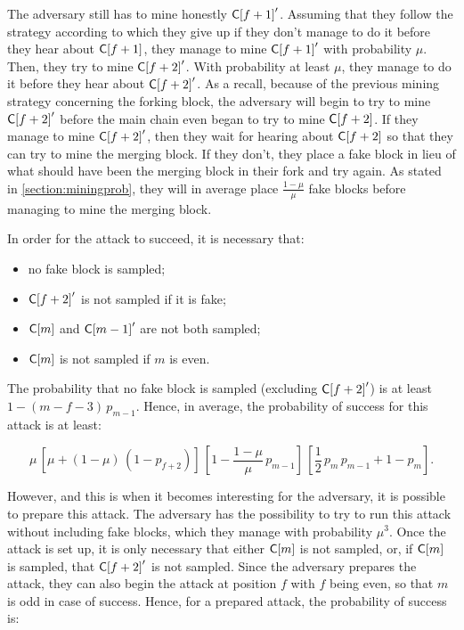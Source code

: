         The adversary still has to mine honestly \(\mathsf{C[}f+1\mathsf{]}'\). Assuming that they follow the strategy according to which they give up if they don't manage to do it before they hear about \(\mathsf{C[}f+1\mathsf{]}\), they manage to mine \(\mathsf{C[}f+1\mathsf{]}'\) with probability \(\mu\). Then, they try to mine \(\mathsf{C[}f+2\mathsf{]}'\). With probability at least \(\mu\), they manage to do it before they hear about \(\mathsf{C[}f+2\mathsf{]}'\). As a recall, because of the previous mining strategy concerning the forking block, the adversary will begin to try to mine \(\mathsf{C[}f+2\mathsf{]}'\) before the main chain even began to try to mine \(\mathsf{C[}f+2\mathsf{]}\). If they manage to mine \(\mathsf{C[}f+2\mathsf{]}'\), then they wait for hearing about \(\mathsf{C[}f+2\mathsf{]}\) so that they can try to mine the merging block. If they don't, they place a fake block in lieu of what should have been the merging block in their fork and try again. As stated in \autoref{section:miningprob}, they will in average place \(\frac{1-\mu}{\mu}\) fake blocks before managing to mine the merging block.

        In order for the attack to succeed, it is necessary that:

        \begin{itemize}
          \item no fake block is sampled;
          \item \(\mathsf{C[}f+2\mathsf{]}'\) is not sampled if it is fake; 
          \item \(\mathsf{C[}m\mathsf{]}\) and \(\mathsf{C[}m-1\mathsf{]}'\) are not both sampled;
          \item \(\mathsf{C[}m\mathsf{]}\) is not sampled if \(m\) is even.  
        \end{itemize}

        The probability that no fake block is sampled (excluding \(\mathsf{C[}f+2\mathsf{]}'\)) is at least \(1-(m-f-3)\,p_{m-1}\). Hence, in average, the probability of success for this attack is at least:

        \[
                \mu\,\left[\mu+(1-\mu)\,\left(1-p_{f+2}\right)\right]\,\left[1-\frac{1-\mu}{\mu}\,p_{m-1}\right]\,\left[\frac12\,p_m\,p_{m-1}+1-p_m\right]
        .\] 

        However, and this is when it becomes interesting for the adversary, it is possible to prepare this attack. The adversary has the possibility to try to run this attack without including fake blocks, which they manage with probability \(\mu^3\). Once the attack is set up, it is only necessary that either \(\mathsf{C[}m\mathsf{]}\) is not sampled, or, if \(\mathsf{C[}m\mathsf{]}\) is sampled, that \(\mathsf{C[}f+2\mathsf{]}'\) is not sampled. Since the adversary prepares the attack, they can also begin the attack at position \(f\) with \(f\) being even, so that \(m\) is odd in case of success. Hence, for a prepared attack, the probability of success is:

